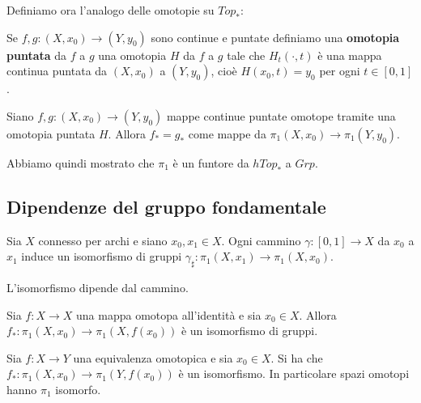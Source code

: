 \begin{multicols*}{2}
\noindent Definiamo ora l'analogo delle omotopie su $Top_\ast$:

\begin{definition}
Se $f,g:(X,x_0)\to(Y,y_0)$ sono continue e puntate definiamo una \textbf{omotopia puntata} da $f$ a $g$ una omotopia $H$ da $f$ a $g$ tale che  $H_t(\cdot ,t)$ è una mappa continua puntata da $(X,x_0)$ a $(Y,y_0)$, cioè  $H(x_0,t)=y_0$ per ogni $t\in[0,1]$.
\end{definition}

\begin{proposition}\label{MappeOmotopePuntateInduconoStessaMappaSuGruppiFondamentali}
Siano $f,g:(X,x_0)\to(Y,y_0)$ mappe continue puntate omotope tramite una omotopia puntata $H$. Allora $f_\ast=g_\ast$ come mappe da $\pi_1(X,x_0)\to\pi_1(Y,y_0)$.
\end{proposition}

\noindent
Abbiamo quindi mostrato che $\pi_1$ \`e un funtore da $hTop_\ast$ a $Grp$.

\subsection{Dipendenze del gruppo fondamentale}

\begin{theorem}\label{PuntoBaseDeterminaPi1GruppoFondamentaleAMenoDiIsomorfismo}
Sia $X$ connesso per archi e siano $x_0,x_1\in X$. Ogni cammino $\gamma:[0,1]\to X$  da $x_0$ a $x_1$ induce un isomorfismo di gruppi $\gamma_\sharp:\pi_1(X,x_1)\to\pi_1(X,x_0)$.
\end{theorem}

\begin{remark}
L'isomorfismo dipende dal cammino.
\end{remark}

\begin{proposition}
Sia $f:X\to X$ una mappa omotopa all'identità e sia $x_0\in X$. Allora $f_\ast:\pi_1(X,x_0)\to\pi_1(X,f(x_0))$ è un isomorfismo di gruppi.
\end{proposition}

\begin{corollary}\label{InvarianzaOmotopicaDelGruppoFondamentale}
Sia $f:X\to Y$ una equivalenza omotopica e sia $x_0\in X$. Si ha che $f_\ast:\pi_1(X,x_0)\to\pi_1(Y,f(x_0))$ è un isomorfismo. In particolare spazi omotopi hanno $\pi_1$ isomorfo.
\end{corollary}



\end{multicols*}
